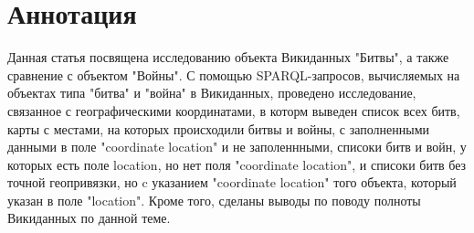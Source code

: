 \section{Аннотация}

Данная статья посвящена исследованию объекта Викиданных "Битвы", а также сравнение с объектом "Войны". С помощью SPARQL-запросов, вычисляемых на объектах типа "битва" и "война" в Викиданных, проведено исследование, связанное с географическими координатами, в которм выведен список всех битв, карты с местами, на которых происходили битвы и войны, с заполненными данными в поле "coordinate location" и не заполеннными, списоки битв и войн, у которых есть поле location, но нет поля "coordinate location", и списоки битв  без точной геопривязки, но c указанием "coordinate location" того объекта, который указан в поле "location". Кроме того, сделаны выводы по поводу полноты Викиданных по данной теме.